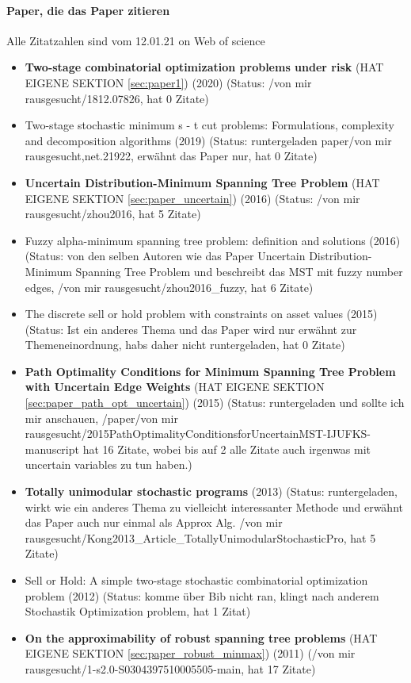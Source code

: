 \documentclass[paper=a4,10pt]{scrartcl}
\begin{document}
\paragraph{Paper, die das Paper zitieren}
Alle Zitatzahlen sind vom 12.01.21 on Web of science
\begin{itemize}
\item \textbf{Two-stage combinatorial optimization problems under risk} (HAT EIGENE SEKTION \ref{sec:paper1}) (2020) (Status: /von mir rausgesucht/1812.07826, hat 0 Zitate)
\item Two-stage stochastic minimum s - t cut problems: Formulations, complexity and decomposition algorithms (2019) (Status: runtergeladen paper/von mir rausgesucht,net.21922, erwähnt das Paper nur, hat 0 Zitate)
\item  \textbf{Uncertain Distribution-Minimum Spanning Tree Problem} (HAT EIGENE SEKTION \ref{sec:paper_uncertain}) (2016) (Status: /von mir rausgesucht/zhou2016, hat 5 Zitate)
\item  Fuzzy alpha-minimum spanning tree problem: definition and solutions (2016) (Status: von den selben Autoren wie das Paper Uncertain Distribution-Minimum Spanning Tree Problem und beschreibt das MST mit fuzzy number edges, /von mir rausgesucht/zhou2016\_fuzzy, hat 6 Zitate)
\item  The discrete sell or hold problem with constraints on asset values (2015) (Status: Ist ein anderes Thema und das Paper wird nur erwähnt zur Themeneinordnung, habs daher nicht runtergeladen, hat 0 Zitate)
\item  \textbf{Path Optimality Conditions for Minimum Spanning Tree Problem with Uncertain Edge Weights} (HAT EIGENE SEKTION \ref{sec:paper_path_opt_uncertain}) (2015) (Status: runtergeladen und sollte ich mir anschauen, /paper/von mir rausgesucht/2015PathOptimalityConditionsforUncertainMST-IJUFKS-manuscript hat 16 Zitate, wobei bis auf 2 alle Zitate auch irgenwas mit uncertain variables zu tun haben.)
\item  \textbf{Totally unimodular stochastic programs} (2013) (Status: runtergeladen, wirkt wie ein anderes Thema zu vielleicht interessanter Methode und erwähnt das Paper auch nur einmal als Approx Alg. /von mir rausgesucht/Kong2013\_Article\_TotallyUnimodularStochasticPro, hat 5 Zitate) 
\item  Sell or Hold: A simple two-stage stochastic combinatorial optimization problem (2012) (Status: komme über Bib nicht ran, klingt nach anderem Stochastik Optimization problem, hat 1 Zitat)
\item  \textbf{On the approximability of robust spanning tree problems} (HAT EIGENE SEKTION \ref{sec:paper_robust_minmax}) (2011) (/von mir rausgesucht/1-s2.0-S0304397510005505-main, hat 17 Zitate) 

\end{itemize}
\end{document}
